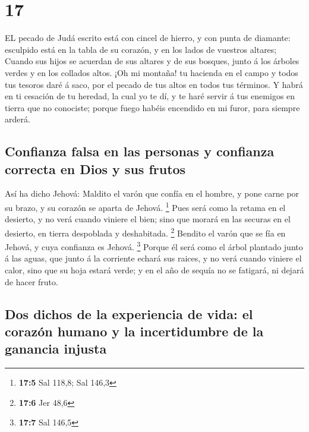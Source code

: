 \hypertarget{section-16}{%
\section{17}\label{section-16}}

 EL pecado de Judá escrito está con cincel de hierro, y con
punta de diamante: esculpido está en la tabla de su corazón, y en los
lados de vuestros altares;  Cuando sus hijos se acuerdan de
sus altares y de sus bosques, junto á los árboles verdes y en los
collados altos.  ¡Oh mi montaña! tu hacienda en el campo y
todos tus tesoros daré á saco, por el pecado de tus altos en todos tus
términos.  Y habrá en ti cesación de tu heredad, la cual yo
te dí, y te haré servir á tus enemigos en tierra que no conociste;
porque fuego habéis encendido en mi furor, para siempre arderá.

\hypertarget{confianza-falsa-en-las-personas-y-confianza-correcta-en-dios-y-sus-frutos}{%
\subsection{Confianza falsa en las personas y confianza correcta en Dios
y sus
frutos}\label{confianza-falsa-en-las-personas-y-confianza-correcta-en-dios-y-sus-frutos}}

 Así ha dicho Jehová: Maldito el varón que confía en el
hombre, y pone carne por su brazo, y su corazón se aparta de Jehová.
\footnote{\textbf{17:5} Sal 118,8; Sal 146,3}  Pues será
como la retama en el desierto, y no verá cuando viniere el bien; sino
que morará en las securas en el desierto, en tierra despoblada y
deshabitada. \footnote{\textbf{17:6} Jer 48,6}  Bendito el
varón que se fía en Jehová, y cuya confianza es Jehová. \footnote{\textbf{17:7}
  Sal 146,5}  Porque él será como el árbol plantado junto á
las aguas, que junto á la corriente echará sus raices, y no verá cuando
viniere el calor, sino que su hoja estará verde; y en el año de sequía
no se fatigará, ni dejará de hacer fruto.

\hypertarget{dos-dichos-de-la-experiencia-de-vida-el-corazuxf3n-humano-y-la-incertidumbre-de-la-ganancia-injusta}{%
\subsection{Dos dichos de la experiencia de vida: el corazón humano y la
incertidumbre de la ganancia
injusta}\label{dos-dichos-de-la-experiencia-de-vida-el-corazuxf3n-humano-y-la-incertidumbre-de-la-ganancia-injusta}}

